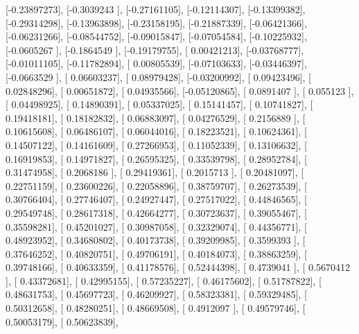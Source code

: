 \documentclass{article}
\begin{document}
       [-0.23897273],
       [-0.3039243 ],
       [-0.27161105],
       [-0.12114307],
       [-0.13399382],
       [-0.29314298],
       [-0.13963898],
       [-0.23158195],
       [-0.21887339],
       [-0.06421366],
       [-0.06231266],
       [-0.08544752],
       [-0.09015847],
       [-0.07054584],
       [-0.10225932],
       [-0.0605267 ],
       [-0.1864549 ],
       [-0.19179755],
       [ 0.00421213],
       [-0.03768777],
       [-0.01011105],
       [-0.11782894],
       [ 0.00805539],
       [-0.07103633],
       [-0.03446397],
       [-0.0663529 ],
       [ 0.06603237],
       [ 0.08979428],
       [-0.03200992],
       [ 0.09423496],
       [ 0.02848296],
       [ 0.00651872],
       [ 0.04935566],
       [-0.05120865],
       [ 0.0891407 ],
       [ 0.055123  ],
       [ 0.04498925],
       [ 0.14890391],
       [ 0.05337025],
       [ 0.15141457],
       [ 0.10741827],
       [ 0.19418181],
       [ 0.18182832],
       [ 0.06883097],
       [ 0.04276529],
       [ 0.2156889 ],
       [ 0.10615608],
       [ 0.06486107],
       [ 0.06044016],
       [ 0.18223521],
       [ 0.10624361],
       [ 0.14507122],
       [ 0.14161609],
       [ 0.27266953],
       [ 0.11052339],
       [ 0.13106632],
       [ 0.16919853],
       [ 0.14971827],
       [ 0.26595325],
       [ 0.33539798],
       [ 0.28952784],
       [ 0.31474958],
       [ 0.2068186 ],
       [ 0.29419361],
       [ 0.2015713 ],
       [ 0.20481097],
       [ 0.22751159],
       [ 0.23600226],
       [ 0.22058896],
       [ 0.38759707],
       [ 0.26273539],
       [ 0.30766404],
       [ 0.27746407],
       [ 0.24927447],
       [ 0.27517022],
       [ 0.44846565],
       [ 0.29549748],
       [ 0.28617318],
       [ 0.42664277],
       [ 0.30723637],
       [ 0.39055467],
       [ 0.35598281],
       [ 0.45201027],
       [ 0.30987058],
       [ 0.32329074],
       [ 0.44356771],
       [ 0.48923952],
       [ 0.34680802],
       [ 0.40173738],
       [ 0.39209985],
       [ 0.3599393 ],
       [ 0.37646252],
       [ 0.40820751],
       [ 0.49706191],
       [ 0.40184073],
       [ 0.38863259],
       [ 0.39748166],
       [ 0.40633359],
       [ 0.41178576],
       [ 0.52444398],
       [ 0.4739041 ],
       [ 0.5670412 ],
       [ 0.43372681],
       [ 0.42995155],
       [ 0.57235227],
       [ 0.46175602],
       [ 0.51787822],
       [ 0.48631753],
       [ 0.45697723],
       [ 0.46209927],
       [ 0.58323381],
       [ 0.59329485],
       [ 0.50312658],
       [ 0.48280251],
       [ 0.48669508],
       [ 0.4912097 ],
       [ 0.49579746],
       [ 0.50053179],
       [ 0.50623839],
\end{document}
